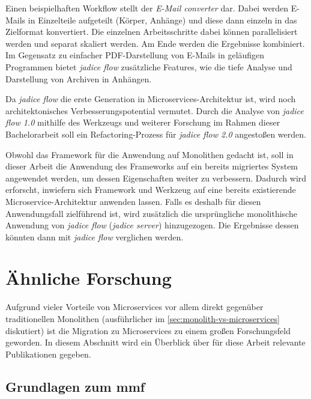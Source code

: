 Einen beispielhaften Workflow stellt der \emph{E-Mail converter} dar.
Dabei werden E-Mails in Einzelteile aufgeteilt (Körper, Anhänge) und diese dann einzeln in das Zielformat konvertiert.
Die einzelnen Arbeitsschritte dabei können parallelisiert werden und separat skaliert werden.
Am Ende werden die Ergebnisse kombiniert.
Im Gegensatz zu einfacher PDF-Darstellung von E-Mails in geläufigen Programmen bietet \emph{jadice flow} zusätzliche Features, wie die tiefe Analyse und Darstellung von Archiven in Anhängen.

Da \emph{jadice flow} die erste Generation in Microservices-Architektur ist, wird noch architektonisches Verbesserungspotential vermutet.
Durch die Analyse von \emph{jadice flow 1.0} mithilfe des Werkzeugs und weiterer Forschung im Rahmen dieser Bachelorarbeit soll ein Refactoring-Prozess für \emph{jadice flow 2.0} angestoßen werden.

Obwohl das Framework für die Anwendung auf Monolithen gedacht ist, soll in dieser Arbeit die Anwendung des Frameworks auf ein bereits migriertes System angewendet werden, um dessen Eigenschaften weiter zu verbessern.
Dadurch wird erforscht, inwiefern sich Framework und Werkzeug auf eine bereits existierende Microservice-Architektur anwenden lassen.
Falls es deshalb für diesen Anwendungsfall zielführend ist, wird zusätzlich die ursprüngliche monolithische Anwendung von \emph{jadice flow} (\emph{jadice server}) hinzugezogen.
Die Ergebnisse dessen könnten dann mit \emph{jadice flow} verglichen werden.

\section{Ähnliche Forschung}

Aufgrund vieler Vorteile von Microservices vor allem direkt gegenüber traditionellen Monolithen (ausführlicher im \cref{sec:monolith-vs-microservices} diskutiert) ist die Migration zu Microservices zu einem großen Forschungsfeld geworden.
In diesem Abschnitt wird ein Überblick über für diese Arbeit relevante Publikationen gegeben.

\subsection{Grundlagen zum \gls{mmf}}

